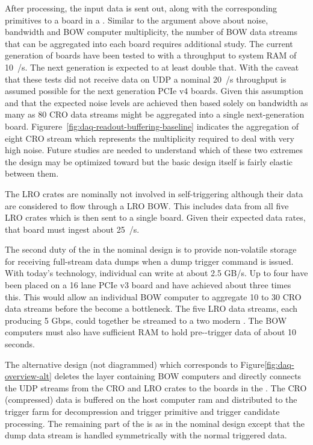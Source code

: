 After processing, the input data is sent out, along with the
corresponding primitives to a  board in a . 
Similar to the argument above about noise, bandwidth and BOW computer
multiplicity, the number of BOW data streams that can be aggregated
into each  board requires additional study. 
The current generation of  boards have been tested to with a
throughput to system RAM of \SI{10}{\GB/\s}. 
The next generation is expected to at least double that. 
With the caveat that these tests did not receive data on UDP a nominal
\SI{20}{\GB/\s} throughput is assumed possible for the next generation
PCIe v4 boards. 
Given this assumption and that the expected noise levels are achieved
then based solely on bandwidth as many as 80 CRO data streams might be
aggregated into a single next-generation  board. 
Figurere~\ref{fig:daq-readout-buffering-baseline} indicates the
aggregation of eight CRO stream which represents the multiplicity
required to deal with very high noise. 
Future studies are needed to understand which of these two extremes
the design may be optimized toward but the basic design itself is
fairly elastic between them.

The LRO crates are nominally not involved in self-triggering although
their data are considered to flow through a LRO BOW. 
This includes data from all five LRO crates which is then sent to a
single  board. 
Given their expected data rates, that  board must ingest about
\SI{25}{\GB/\s}.

The second duty of the  in the nominal design is to
provide non-volatile storage for receiving full-stream data dumps when
a  dump trigger command is issued. 
With today's technology, individual  can write at about 2.5 GB/s. 
Up to four  have been placed on a 16 lane PCIe v3 board and have
achieved about three times this. 
This would allow an individual BOW computer to aggregate 10 to 30 CRO
data streams before the  become a bottleneck. 
The five LRO data streams, each producing 5 Gbps, could together be
streamed to a two modern . 
The BOW computers must also have sufficient RAM to hold
pre--trigger data of about 10 seconds.

The alternative design (not diagrammed) which corresponds to
Figure\ref{fig:daq-overview-alt} deletes the layer containing BOW
computers and directly connects the UDP streams from the CRO and LRO
crates to the  boards in the . 
The CRO (compressed) data is buffered on the  host computer ram
and distributed to the trigger farm for decompression and trigger
primitive and trigger candidate processing. 
The remaining part of the  is as in the nominal
design except that the  dump data stream is handled symmetrically
with the normal triggered data.

